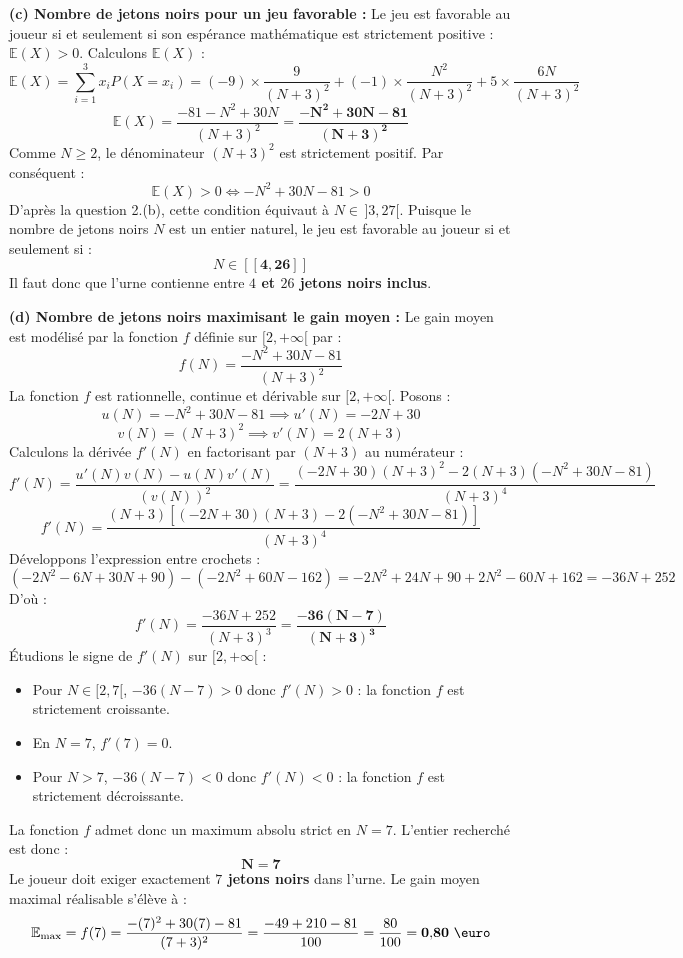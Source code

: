 \documentclass[11pt,a4paper]{article}
\newcommand{\E}{\mathbb{E}}
\begin{document}
\begin{correctionbox}
\textbf{(c) Nombre de jetons noirs pour un jeu favorable :}
Le jeu est favorable au joueur si et seulement si son espérance mathématique est strictement positive : $\E(X) > 0$.
Calculons $\E(X)$ :
\[
\E(X) = \sum_{i=1}^3 x_i P(X = x_i) = (-9) \times \frac{9}{(N+3)^2} + (-1) \times \frac{N^2}{(N+3)^2} + 5 \times \frac{6N}{(N+3)^2}
\]
\[
\E(X) = \frac{-81 - N^2 + 30N}{(N+3)^2} = \mathbf{\frac{-N^2 + 30N - 81}{(N+3)^2}}
\]
Comme $N \ge 2$, le dénominateur $(N+3)^2$ est strictement positif. Par conséquent :
\[
\E(X) > 0 \iff -N^2 + 30N - 81 > 0
\]
D'après la question 2.(b), cette condition équivaut à $N \in \,]3, 27[$.
Puisque le nombre de jetons noirs $N$ est un entier naturel, le jeu est favorable au joueur si et seulement si :
\[
N \in \boldsymbol{[\![4, 26]\!]}
\]
Il faut donc que l'urne contienne entre \textbf{$4$ et $26$ jetons noirs inclus}.

\textbf{(d) Nombre de jetons noirs maximisant le gain moyen :}
Le gain moyen est modélisé par la fonction $f$ définie sur $[2, +\infty[$ par :
\[
f(N) = \frac{-N^2 + 30N - 81}{(N+3)^2}
\]
La fonction $f$ est rationnelle, continue et dérivable sur $[2, +\infty[$. Posons :
\[
u(N) = -N^2 + 30N - 81 \implies u'(N) = -2N + 30
\]
\[
v(N) = (N+3)^2 \implies v'(N) = 2(N+3)
\]
Calculons la dérivée $f'(N)$ en factorisant par $(N+3)$ au numérateur :
\[
f'(N) = \frac{u'(N)v(N) - u(N)v'(N)}{(v(N))^2} = \frac{(-2N + 30)(N+3)^2 - 2(N+3)(-N^2 + 30N - 81)}{(N+3)^4}
\]
\[
f'(N) = \frac{(N+3)\left[(-2N + 30)(N+3) - 2(-N^2 + 30N - 81)\right]}{(N+3)^4}
\]
Développons l'expression entre crochets :
\[
(-2N^2 - 6N + 30N + 90) - (-2N^2 + 60N - 162) = -2N^2 + 24N + 90 + 2N^2 - 60N + 162 = -36N + 252
\]
D'où :
\[
f'(N) = \frac{-36N + 252}{(N+3)^3} = \mathbf{\frac{-36(N - 7)}{(N+3)^3}}
\]
Étudions le signe de $f'(N)$ sur $[2, +\infty[$ :
\begin{itemize}[label=$\bullet$]
    \item Pour $N \in [2, 7[$, $-36(N-7) > 0$ donc $f'(N) > 0$ : la fonction $f$ est strictement croissante.
    \item En $N = 7$, $f'(7) = 0$.
    \item Pour $N > 7$, $-36(N-7) < 0$ donc $f'(N) < 0$ : la fonction $f$ est strictement décroissante.
\end{itemize}
La fonction $f$ admet donc un maximum absolu strict en $N = 7$.
L'entier recherché est donc :
\[
\mathbf{N = 7}
\]
Le joueur doit exiger exactement \textbf{$7$ jetons noirs} dans l'urne.
Le gain moyen maximal réalisable s'élève à :
\[
\E_{\max} = f(7) = \frac{-(7)^2 + 30(7) - 81}{(7+3)^2} = \frac{-49 + 210 - 81}{100} = \frac{80}{100} = \mathbf{0{,}80\text{ \euro}}
\]
\end{correctionbox}
\end{document}
